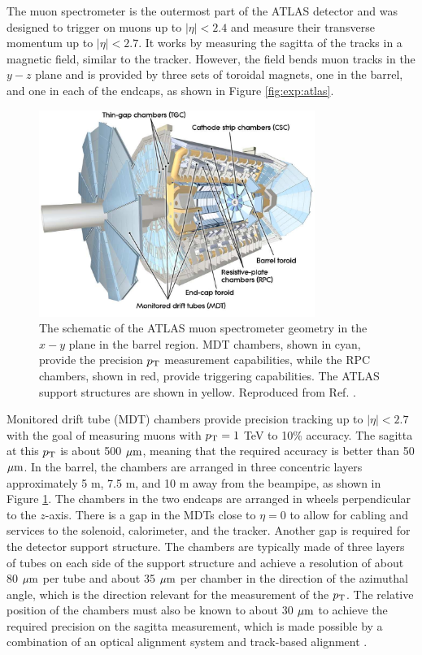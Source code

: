 The muon spectrometer is the outermost part of the ATLAS detector and was designed to
trigger on muons up to $|\eta| < 2.4$ and measure their transverse momentum up
to $|\eta| < 2.7$. It works by measuring the sagitta of the tracks
in a magnetic field, similar to the tracker. However, the field
bends muon tracks in the $y-z$ plane and is provided by three sets of
toroidal magnets, one in the barrel, and one in each of the endcaps,
as shown in Figure \ref{fig:exp:atlas}. 
\begin{figure}[h!]
  \centering
  \includegraphics[width=0.8\textwidth]{figures/experiment/muonspectrometer}
  \caption[The ATLAS muon spectrometer]{The schematic of the ATLAS muon
  spectrometer geometry in the $x-y$ plane in the barrel region. MDT
  chambers, shown in cyan, provide the precision $p_{\text{T}}$ measurement
  capabilities, while the RPC chambers, shown in red, provide triggering
  capabilities. The ATLAS support structures are shown in yellow.
  Reproduced from Ref. \cite{Aad:2010ag}.}
   \label{fig:exp:ms}
\end{figure}

Monitored drift tube (MDT) chambers provide precision tracking up to
$|\eta| < 2.7$ with the goal of measuring muons with $p_{\text{T}} = 1$ TeV
to 10\% accuracy. The sagitta at this $p_{\text{T}}$ is about 500 $\mu\text{m}$,
meaning that the required accuracy is better than 50 $\mu\text{m}$.
In the barrel, the chambers are arranged in three concentric
layers approximately 5 m, 7.5 m, and 10 m away from the beampipe, as
shown in Figure \ref{fig:exp:ms}. The chambers in the two endcaps are
arranged in wheels perpendicular to the $z$-axis. There is a gap in
the MDTs close to $\eta = 0$ to allow for cabling and services to
the solenoid, calorimeter, and the tracker. Another gap is required
for the detector support structure. The chambers are typically
made of three layers of tubes on each side of the support structure
and achieve a resolution of about 80 $\mu\text{m}$ per tube and about
35 $\mu\text{m}$ per chamber in the direction of the azimuthal angle, which is
the direction relevant for the measurement of the $p_{\text{T}}$.
The relative position of the chambers must also be
known to about 30 $\mu\text{m}$ to achieve the required precision on the sagitta
measurement, which is made possible by a combination of an optical alignment
system and track-based alignment \cite{Aad:2010ag, Aefsky:1380912, Aad:2008zzm}.

